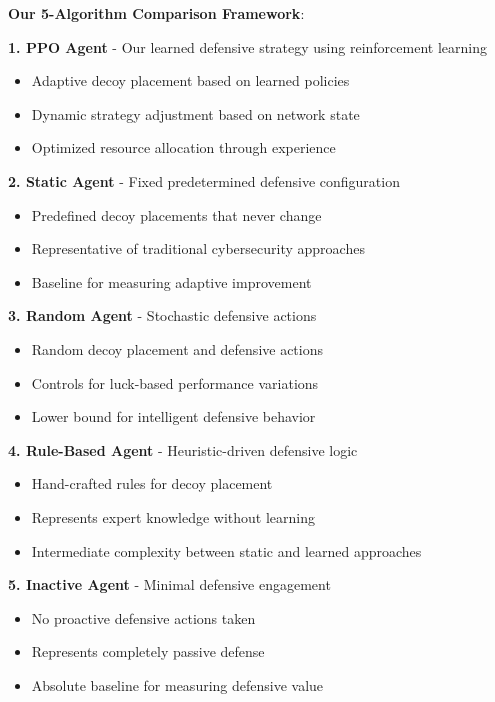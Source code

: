 \documentclass[11pt]{article}
\begin{document}
\begin{example}
\textbf{Our 5-Algorithm Comparison Framework}:

\textbf{1. PPO Agent} - Our learned defensive strategy using reinforcement learning
\begin{itemize}
\item Adaptive decoy placement based on learned policies
\item Dynamic strategy adjustment based on network state
\item Optimized resource allocation through experience
\end{itemize}

\textbf{2. Static Agent} - Fixed predetermined defensive configuration
\begin{itemize}
\item Predefined decoy placements that never change
\item Representative of traditional cybersecurity approaches
\item Baseline for measuring adaptive improvement
\end{itemize}

\textbf{3. Random Agent} - Stochastic defensive actions
\begin{itemize}
\item Random decoy placement and defensive actions
\item Controls for luck-based performance variations
\item Lower bound for intelligent defensive behavior
\end{itemize}

\textbf{4. Rule-Based Agent} - Heuristic-driven defensive logic
\begin{itemize}
\item Hand-crafted rules for decoy placement
\item Represents expert knowledge without learning
\item Intermediate complexity between static and learned approaches
\end{itemize}

\textbf{5. Inactive Agent} - Minimal defensive engagement
\begin{itemize}
\item No proactive defensive actions taken
\item Represents completely passive defense
\item Absolute baseline for measuring defensive value
\end{itemize}
\end{example}
\end{document}
